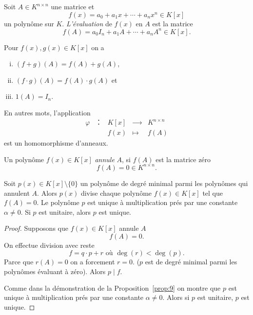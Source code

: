 Soit $A ∈ K^{n ×n}$ une matrice et
\begin{displaymath}
  f(x) = a_0 + a_1 x + \cdots + a_n x^n∈ K[x] 
\end{displaymath}
un polynôme sur $K$.   \emph{L'évaluation} de $f(x)$ en $A$  est la matrice
\begin{displaymath}
  f(A) = a_0 I_n + a_1 A + \cdots + a_n A^n∈ K[x].  
\end{displaymath}

\begin{exercise}
  Pour $f(x), g(x) ∈ K[x]$  on a
  \begin{enumerate}[i)] 
  \item $(f+g)(A) = f(A) + g(A)$, 
  \item $(f⋅g)(A) = f(A) ⋅ g(A)$ et
  \item $1(A) = I_n$.   
  \end{enumerate}
En autres mots, l'application 
  \begin{displaymath}
    \begin{array}{rclcl}
      φ&： & K[x]& ⟶ & K^{n ×n} \\
       &   & f(x)& \longmapsto & f(A) 
    \end{array}
  \end{displaymath}
  est un homomorphisme d'anneaux. 
\end{exercise}

Un polynôme $f(x) ∈ K[x]$ \emph{annule} $A$, si $f(A)$ est la matrice zéro
\begin{displaymath}
  f(A) = 0 ∈ K^{n ×n}. 
\end{displaymath}

\begin{theorem}
\label{thr:61}
  Soit $p(x) ∈ K[x]\setminus \{0\}$ un polynôme de degré minimal parmi les polynômes qui annulent $A$. 
  Alors $p(x)$ divise chaque polynôme  $f(x) ∈ K[x]$  tel que $f(A) = 0$.
Le polynôme $p$ est unique à multiplication prés par une constante $α ≠0$.
  Si $p$ est unitaire, alors $p$ est unique. 
\end{theorem}

\begin{proof}
  Supposons que $f(x)∈ K[x]$ annule $A$
  \begin{displaymath}
    f(A) = 0. 
  \end{displaymath}
On effectue division avec reste
  \begin{displaymath}
    f = q ⋅ p + r \text{ où } \deg(r) < \deg(p). 
  \end{displaymath}
  Parce que $r(A) = 0$ on a forcement $r = 0$. ($p$ est de degré minimal parmi les polynômes  évaluant à zéro). Alors $p \mid f$.

Comme dans la démonstration de la Proposition~\ref{prop:9} on montre que  $p$ est unique à multiplication prés par une constante $α ≠0$. Alors si $p$ est unitaire,  $p$ est unique. 
\end{proof}




